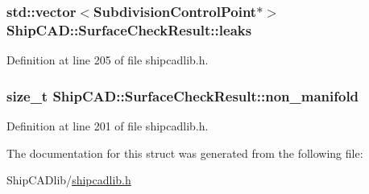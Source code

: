 \subsubsection[{\texorpdfstring{leaks}{leaks}}]{\setlength{\rightskip}{0pt plus 5cm}std\+::vector$<${\bf Subdivision\+Control\+Point}$\ast$$>$ Ship\+C\+A\+D\+::\+Surface\+Check\+Result\+::leaks}\hypertarget{structShipCAD_1_1SurfaceCheckResult_ac9e1040a8818a6ecb98ab8981115deeb}{}\label{structShipCAD_1_1SurfaceCheckResult_ac9e1040a8818a6ecb98ab8981115deeb}


Definition at line 205 of file shipcadlib.\+h.

\subsubsection[{\texorpdfstring{non\+\_\+manifold}{non_manifold}}]{\setlength{\rightskip}{0pt plus 5cm}size\+\_\+t Ship\+C\+A\+D\+::\+Surface\+Check\+Result\+::non\+\_\+manifold}\hypertarget{structShipCAD_1_1SurfaceCheckResult_a781d013ead5911ba9646334c00686985}{}\label{structShipCAD_1_1SurfaceCheckResult_a781d013ead5911ba9646334c00686985}


Definition at line 201 of file shipcadlib.\+h.



The documentation for this struct was generated from the following file\+:\begin{DoxyCompactItemize}
\item 
Ship\+C\+A\+Dlib/\hyperlink{shipcadlib_8h}{shipcadlib.\+h}\end{DoxyCompactItemize}
